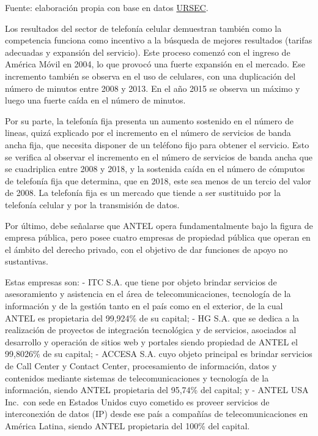 \documentclass[
  12pt,
  spanish,
]{book}
\begin{document}
Fuente: elaboración propia con base en datos
\href{https://www.gub.uy/unidad-reguladora-servicios-comunicaciones/sites/unidad-reguladora-servicios-comunicaciones/files/2019-10/Informe\%20Telecomunicaciones\%20a\%20diciembre\%20de\%202018\%20corregido.pdf}{URSEC}.

Los resultados del sector de telefonía celular demuestran también como
la competencia funciona como incentivo a la búsqueda de mejores
resultados (tarifas adecuadas y expansión del servicio). Este proceso
comenzó con el ingreso de América Móvil en 2004, lo que provocó una
fuerte expansión en el mercado. Ese incremento también se observa en el
uso de celulares, con una duplicación del número de minutos entre 2008 y
2013. En el año 2015 se observa un máximo y luego una fuerte caída en el
número de minutos.

Por su parte, la telefonía fija presenta un aumento sostenido en el
número de lineas, quizá explicado por el incremento en el número de
servicios de banda ancha fija, que necesita disponer de un teléfono fijo
para obtener el servicio. Esto se verifica al observar el incremento en
el número de servicios de banda ancha que se cuadriplica entre 2008 y
2018, y la sostenida caída en el número de cómputos de telefonía fija
que determina, que en 2018, este sea menos de un tercio del valor de
2008. La telefonía fija es un mercado que tiende a ser sustituido por la
telefonía celular y por la transmisión de datos.

Por último, debe señalarse que ANTEL opera fundamentalmente bajo la
figura de empresa pública, pero posee cuatro empresas de propiedad
pública que operan en el ámbito del derecho privado, con el objetivo de
dar funciones de apoyo no sustantivas.

Estas empresas son: - ITC S.A. que tiene por objeto brindar servicios de
asesoramiento y asistencia en el área de telecomunicaciones, tecnología
de la información y de la gestión tanto en el país como en el exterior,
de la cual ANTEL es propietaria del 99,924\% de su capital; - HG S.A.
que se dedica a la realización de proyectos de integración tecnológica y
de servicios, asociados al desarrollo y operación de sitios web y
portales siendo propiedad de ANTEL el 99,8026\% de su capital; - ACCESA
S.A. cuyo objeto principal es brindar servicios de Call Center y Contact
Center, procesamiento de información, datos y contenidos mediante
sistemas de telecomunicaciones y tecnología de la información, siendo
ANTEL propietaria del 95,74\% del capital; y - ANTEL USA Inc.~con sede
en Estados Unidos cuyo cometido es proveer servicios de interconexión de
datos (IP) desde ese país a compañías de telecomunicaciones en América
Latina, siendo ANTEL propietaria del 100\% del capital.
\end{document}
